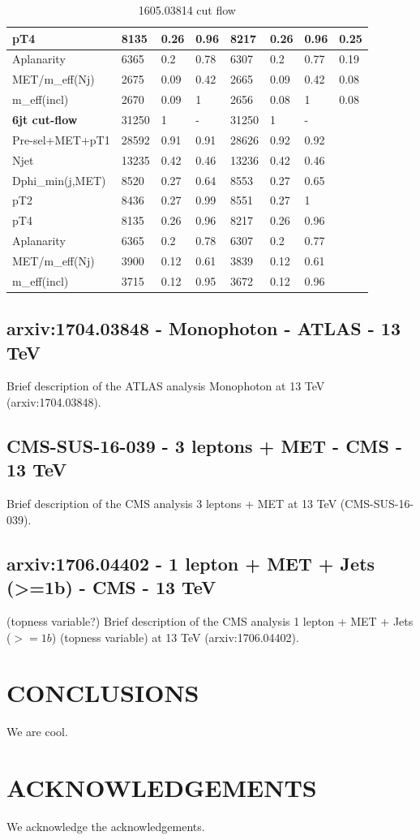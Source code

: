 \documentclass[11pt]{cernrep}
\begin{document}
\begin{table}[htbp]
\begin{tabular}{ | l || l | l | l || l | l | l || l | }
pT4               & 8135 & 0.26 & 0.96 & 8217 & 0.26 & 0.96 & 0.25  \\ \hline
Aplanarity        & 6365 & 0.2 & 0.78 & 6307 & 0.2 & 0.77 & 0.19  \\ \hline
MET/m\_eff(Nj)     & 2675 & 0.09 & 0.42 & 2665 & 0.09 & 0.42 & 0.08  \\ \hline
m\_eff(incl)       & 2670 & 0.09 & 1 & 2656 & 0.08 & 1 & 0.08  \\ \hline
\hline
{\bf 6jt cut-flow} & 31250 & 1 & - & 31250 & 1 & - & \   \\ \hline
Pre-sel+MET+pT1   & 28592 & 0.91 & 0.91 & 28626 & 0.92 & 0.92 & \   \\ \hline
Njet              & 13235 & 0.42 & 0.46 & 13236 & 0.42 & 0.46 & \   \\ \hline
Dphi\_min(j,MET)   & 8520 & 0.27 & 0.64 & 8553 & 0.27 & 0.65 & \   \\ \hline
pT2               & 8436 & 0.27 & 0.99 & 8551 & 0.27 & 1 & \   \\ \hline
pT4               & 8135 & 0.26 & 0.96 & 8217 & 0.26 & 0.96 & \   \\ \hline
Aplanarity        & 6365 & 0.2 & 0.78 & 6307 & 0.2 & 0.77 & \   \\ \hline
MET/m\_eff(Nj)     & 3900 & 0.12 & 0.61 & 3839 & 0.12 & 0.61 & \   \\ \hline
m\_eff(incl)       & 3715 & 0.12 & 0.95 & 3672 & 0.12 & 0.96 & \   \\ \hline
			
		\end{tabular}
	\caption{1605.03814 cut flow}
	\label{tab:1605.03814}
\end{table}

\subsection{arxiv:1704.03848 - Monophoton - ATLAS - 13 TeV}
Brief description of the ATLAS analysis Monophoton at 13 TeV (arxiv:1704.03848).

\subsection{CMS-SUS-16-039 - 3 leptons + MET - CMS - 13 TeV}
Brief description of the CMS analysis 3 leptons + MET at 13 TeV (CMS-SUS-16-039).

\subsection{arxiv:1706.04402 - 1 lepton + MET + Jets (>=1b) - CMS - 13 TeV} (topness variable?)
Brief description of the CMS analysis 1 lepton + MET + Jets ($>=1b$) (topness variable) at 13 TeV (arxiv:1706.04402).

\section*{CONCLUSIONS}
We are cool.

\section*{ACKNOWLEDGEMENTS}
We acknowledge the acknowledgements.


\end{document}
